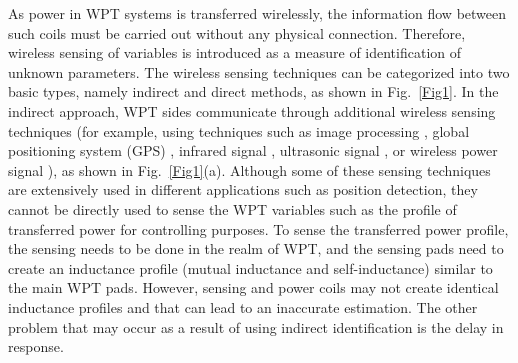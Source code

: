 \documentclass[journal,a4paper]{IEEEtran}
\begin{document}
As power in WPT systems is transferred wirelessly, the information flow between such coils must be carried out without any physical connection.
{\color{black}Therefore, wireless sensing of variables is introduced as a measure of identification of unknown parameters.}
The wireless sensing techniques can be categorized into two basic types, namely indirect and direct methods, as shown in Fig.~\ref{Fig1}. In the indirect approach, WPT sides communicate through additional wireless sensing techniques (for example, using techniques such as image processing \cite{IMAGE_RECOGNITION}, global positioning system (GPS) \cite{GPS_DETECTION_1, GPS_DETECTION_2}, infrared signal \cite{INFRARED}, ultrasonic signal \cite{ULTRASONIC}, or wireless power signal \cite{WPT_SENSE_1}), as shown in Fig.~\ref{Fig1}(a). Although some of these sensing techniques are extensively used in different applications such as position detection, they cannot be directly used to sense the WPT variables such as the profile of transferred power for controlling purposes. To sense the transferred power profile, the sensing needs to be done in the realm of WPT, and the sensing pads need to create an inductance profile (mutual inductance and self-inductance) similar to the main WPT pads. However, sensing and power coils may not create identical inductance profiles and that can lead to an inaccurate estimation. The other problem that may occur as a result of using indirect identification is the delay in response. 
\end{document}
